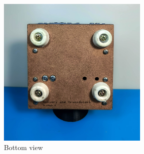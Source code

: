 \begin{figure}[H]
    \centering
    \includegraphics[width=0.65\textwidth]{medias/photos/bottom.jpg}
    \caption{Bottom view}
    \label{fig:immagine}
\end{figure}

